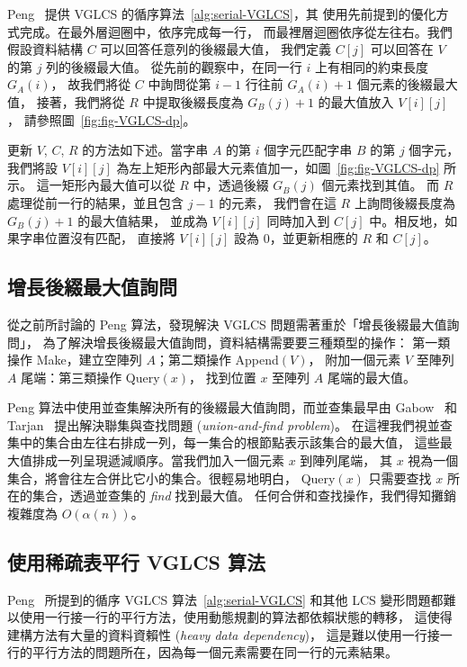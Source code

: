 Peng~\cite{Peng2011TheLC} 提供 VGLCS 的循序算法~\ref{alg:serial-VGLCS}，其
使用先前提到的優化方式完成。在最外層迴圈中，依序完成每一行，
而最裡層迴圈依序從左往右。我們假設資料結構 $C$ 可以回答任意列的後綴最大值，
我們定義 $C[j]$ 可以回答在 $V$ 的第 $j$ 列的後綴最大值。
從先前的觀察中，在同一行 $i$ 上有相同的約束長度 $G_A(i)$，
故我們將從 $C$ 中詢問從第 $i-1$ 行往前 $G_A(i)+1$ 個元素的後綴最大值，
接著，我們將從 $R$ 中提取後綴長度為 $G_B(j)+1$ 的最大值放入 $V[i][j]$，
請參照圖~\ref{fig:fig-VGLCS-dp}。

更新 $V$, $C$, $R$ 的方法如下述。當字串 $A$ 的第 $i$ 個字元匹配字串 $B$ 的第 $j$ 個字元，
我們將設 $V[i][j]$ 為左上矩形內部最大元素值加一，如圖~\ref{fig:fig-VGLCS-dp} 所示。
這一矩形內最大值可以從 $R$ 中，透過後綴 $G_B(j)$ 個元素找到其值。
而 $R$ 處理從前一行的結果，並且包含 $j-1$ 的元素，
我們會在這 $R$ 上詢問後綴長度為 $G_B(j)+1$ 的最大值結果，
並成為 $V[i][j]$ 同時加入到 $C[j]$ 中。相反地，如果字串位置沒有匹配，
直接將 $V[i][j]$ 設為 0，並更新相應的 $R$ 和 $C[j]$。
 


\subsection{增長後綴最大值詢問}

從之前所討論的 Peng 算法，發現解決 VGLCS 問題需著重於「增長後綴最大值詢問」，
為了解決增長後綴最大值詢問，資料結構需要要三種類型的操作：
第一類操作 {\sc Make}，建立空陣列 $A$；第二類操作 {\sc Append}$(V)$，
附加一個元素 $V$ 至陣列 $A$ 尾端：第三類操作 {\sc Query}$(x)$，
找到位置 $x$ 至陣列 $A$ 尾端的最大值。

Peng 算法中使用並查集解決所有的後綴最大值詢問，而並查集最早由 
Gabow~\cite{Gabow1983ALA} 和 Tarjan~\cite{Tarjan1975EfficiencyOA} 
提出解決聯集與查找問題 ({\em union-and-find problem})。
在這裡我們視並查集中的集合由左往右排成一列，每一集合的根節點表示該集合的最大值，
這些最大值排成一列呈現遞減順序。當我們加入一個元素 $x$ 到陣列尾端，
其 $x$ 視為一個集合，將會往左合併比它小的集合。很輕易地明白，
{\sc Query}$(x)$ 只需要查找 $x$ 所在的集合，透過並查集的 {\em find} 找到最大值。
任何合併和查找操作，我們得知攤銷複雜度為 $O(\alpha(n))$。

\subsection{使用稀疏表平行 VGLCS 算法}

Peng~\cite{Peng2011TheLC} 所提到的循序 VGLCS 算法~\ref{alg:serial-VGLCS} 
和其他 LCS 變形問題都難以使用一行接一行的平行方法，使用動態規劃的算法都依賴狀態的轉移，
這使得建構方法有大量的資料資賴性 ({\em heavy data dependency})，
這是難以使用一行接一行的平行方法的問題所在，因為每一個元素需要在同一行的元素結果。

